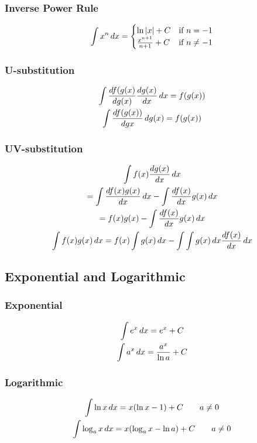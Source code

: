\documentclass[12pt]{article}
\begin{document}
			\subsubsection{Inverse Power Rule}
				\begin{gather}
					\antider{x^n} =
						\begin{cases}
							\ln |x| + C & \text{if }
							n = -1 \\
							\frac{x^{n+1}}{n+1} + C
							& \text{if } n \neq -1
						\end{cases}
				\end{gather}
			\subsubsection{U-substitution}
				\begin{gather}
					\antider{\deriv[g(x)]{f(g(x)}\deriv{g(x)}}
					= f(g(x)) \\
					\int
					\deriv[g{x}]{f(g(x))}\,dg(x) =
					f(g(x))
				\end{gather}
			\subsubsection{UV-substitution}
				\begin{gather}
					\antider{f(x)\deriv{g(x)}} \\
					= \antider{\deriv{f(x)g(x)}} -
					\antider{\deriv{f(x)}g(x)} \\
					= f(x)g(x) - \antider{\deriv{f(x)}g(x)}
					\\
					\antider{f(x)g(x)} = f(x)\antider{g(x)}
					- \antider{\antider{g(x)}\deriv{f(x)}}
				\end{gather}
		\subsection{Exponential and Logarithmic}
			\subsubsection{Exponential}
				\begin{gather}
					\antider{e^x} = e^x + C \\
					\antider{a^x} = \frac{a^x}{\ln a} + C
				\end{gather}
			\subsubsection{Logarithmic}
				\begin{gather}
					\antider{\ln x} = x(\ln x - 1) + C
					\qquad a \neq 0 \\
					\antider{\log_ax} = x(\log_ax - \ln a) +
					C \qquad a \neq 0
				\end{gather}
\end{document}
